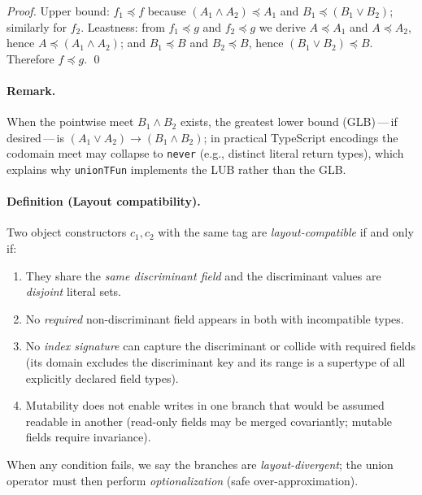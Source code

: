 \documentclass[11pt]{article}
\begin{document}
\emph{Proof.}
Upper bound: $f_1 \preceq f$ because $(A_1\wedge A_2) \preceq A_1$ and $B_1 \preceq (B_1\vee B_2)$; similarly for $f_2$.
Leastness: from $f_1 \preceq g$ and $f_2 \preceq g$ we derive $A \preceq A_1$ and $A \preceq A_2$, hence $A \preceq (A_1\wedge A_2)$; and $B_1 \preceq B$ and $B_2 \preceq B$, hence $(B_1\vee B_2) \preceq B$. Therefore $f \preceq g$. \qed

\paragraph*{Remark.}
When the pointwise meet $B_1 \wedge B_2$ exists, the greatest lower bound (GLB)\,---\,if desired\,---\,is $(A_1 \vee A_2) \to (B_1 \wedge B_2)$; in practical TypeScript encodings the codomain meet may collapse to \texttt{never} (e.g., distinct literal return types), which explains why \texttt{unionTFun} implements the LUB rather than the GLB.

\paragraph{Definition (Layout compatibility).}\label{def:layout-compat}
Two object constructors $c_1,c_2$ with the same tag are \emph{layout-compatible} if and only if:
\begin{enumerate}[label=(\arabic*),leftmargin=*]
  \item They share the \emph{same discriminant field} and the discriminant values are \emph{disjoint} literal sets.
  \item No \emph{required} non-discriminant field appears in both with incompatible types.
  \item No \emph{index signature} can capture the discriminant or collide with required fields (its domain excludes the discriminant key and its range is a supertype of all explicitly declared field types).
  \item Mutability does not enable writes in one branch that would be assumed readable in another (read-only fields may be merged covariantly; mutable fields require invariance).
\end{enumerate}
When any condition fails, we say the branches are \emph{layout-divergent}; the union operator must then perform \emph{optionalization} (safe over-approximation).
\end{document}
